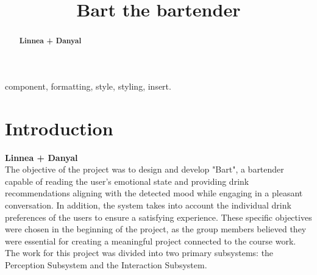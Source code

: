 \documentclass[conference]{IEEEtran}
\begin{document}
\title{Bart the bartender\\
}

\author{
\and
{}

\and
{}
\and
{}

}

\maketitle


\begin{abstract}
\textbf{Linnea + Danyal}
\end{abstract}

\begin{IEEEkeywords}
component, formatting, style, styling, insert.
\end{IEEEkeywords}

\section{Introduction}
\textbf{Linnea + Danyal}\\
The objective of the project was to design and develop "Bart", a bartender capable of reading the user's emotional state and providing drink recommendations aligning with the detected mood while engaging in a pleasant conversation. In addition, the system takes into account the individual drink preferences of the users to ensure a satisfying experience. These specific objectives were chosen in the beginning of the project, as the group members believed they were essential for creating a meaningful project connected to the course work. 
The work for this project was divided into two primary subsystems: the Perception Subsystem and the Interaction Subsystem. 
\end{document}
